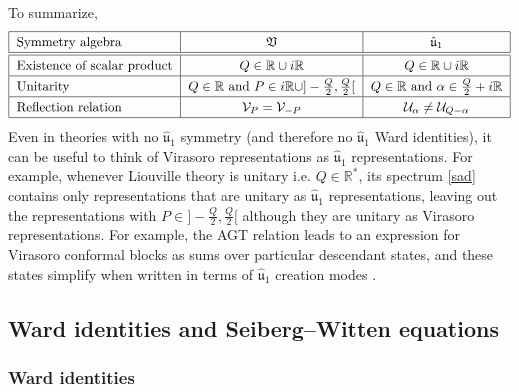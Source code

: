 \documentclass[12pt, a4paper, notitlepage, twoside]{report}
\numberwithin{equation}{section}
\theoremstyle{break}
\begin{document}
To summarize,
\begin{align}
\renewcommand{\arraystretch}{1.3}
 \begin{tabular}{|l|c|c|}
  \hline
 Symmetry algebra  & $\mathfrak{V}$ & $\hat{\mathfrak{u}}_1 $
\\
\hline\hline
 Existence of scalar product & $Q\in {\mathbb{R}} \cup i{\mathbb{R}} $ & $Q\in {\mathbb{R}} \cup i{\mathbb{R}}$ 
\\
\hline
 Unitarity & $Q\in\mathbb{R}$ and $P\in i{\mathbb{R}} \cup ]-\frac{Q}{2},\frac{Q}{2}[ $ &  $Q\in\mathbb{R}$ and $\alpha \in \frac{Q}{2}+i{\mathbb{R}}$
\\
\hline 
 Reflection relation  & $\mathcal{V}_P = \mathcal{V}_{-P} $ & $\mathcal{U}_\alpha \neq \mathcal{U}_{Q-\alpha} $ 
\\
\hline
 \end{tabular}
\end{align}
Even in theories with no $\hat{\mathfrak{u}}_1$ symmetry (and therefore no $\hat{\mathfrak{u}}_1$ Ward identities), 
it can be useful to think of Virasoro representations as $\hat{\mathfrak{u}}_1$ representations. 
For example,
whenever Liouville theory is unitary i.e. $Q\in\mathbb{R}^*$, its spectrum \eqref{sad} contains only representations that are unitary as $\hat{\mathfrak{u}}_1$ representations, leaving out the representations with $P\in ]-\frac{Q}{2}, \frac{Q}{2}[$ although they are unitary as Virasoro representations. 
For example, the AGT relation leads to an expression for Virasoro conformal blocks as sums over particular descendant states, and these states simplify when written in terms of $\hat{\mathfrak{u}}_1$ creation modes \cite{aflt10}.


\subsection{Ward identities and Seiberg--Witten equations}

\subsubsection{Ward identities}
\end{document}

